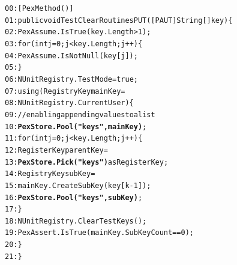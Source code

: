 \begin{figure}[t]
\begin{CodeOut}
\begin{alltt}
00:[PexMethod()]
01:public void TestClearRoutinesPUT([PAUT]String[] key) \{
02:\hspace*{0.1in}PexAssume.IsTrue(key.Length > 1);
03:\hspace*{0.1in}for (int j = 0; j < key.Length; j++) \{
04:\hspace*{0.3in}PexAssume.IsNotNull(key[j]);
05:\hspace*{0.1in}\}
06:\hspace*{0.1in}NUnitRegistry.TestMode = true;
07:\hspace*{0.1in}using (RegistryKey mainKey = 
08:\hspace*{0.3in}NUnitRegistry.CurrentUser) \{
09:\hspace*{0.3in}//enabling appending values to a list
10:\hspace*{0.3in}\textbf{PexStore.Pool("keys",mainKey)}; 
11:\hspace*{0.3in}for (int j = 0; j < key.Length; j++) \{
12:\hspace*{0.5in}RegisterKey parentKey = 
13:\hspace*{0.7in}\textbf{PexStore.Pick("keys")} as RegisterKey;
14:\hspace*{0.5in}RegistryKey subKey = 
15:\hspace*{0.7in}mainKey.CreateSubKey(key[k - 1]);
16:\hspace*{0.5in}\textbf{PexStore.Pool("keys",subKey)};
17:\hspace*{0.3in}\}
18:\hspace*{0.3in}NUnitRegistry.ClearTestKeys();
19:\hspace*{0.3in}PexAssert.IsTrue(mainKey.SubKeyCount == 0);
20:\hspace*{0.1in}\}
21:\}
\end{alltt}
\end{CodeOut}
\label{fig:treepattern}
\end{figure}
